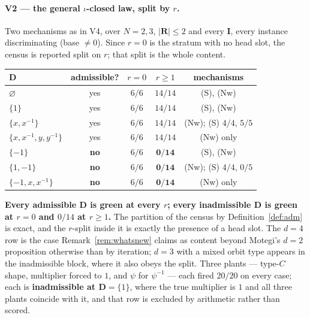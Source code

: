 \documentclass[11pt]{article}
\theoremstyle{definition}
\newcommand{\bI}{\mathbf{I}}
\newcommand{\bD}{\mathbf{D}}
\newcommand{\bR}{\mathbf{R}}
\begin{document}
\paragraph{V2 --- the general $\iota$-closed law, split by $r$.}  Two mechanisms
as in V4, over $N=2,3$, $|\bR|\le2$ and every $\bI$, every instance
discriminating (base $\ne0$).  Since $r=0$ is the stratum with no head slot, the
census is reported split on $r$; that split is the whole content.
\begin{center}
\begin{tabular}{@{}lcccc@{}}
\toprule
$\bD$ & admissible? & $r=0$ & $r\ge1$ & mechanisms\\
\midrule
$\varnothing$                & yes & $6/6$ & $14/14$ & (S), (Nw)\\
$\{1\}$                      & yes & $6/6$ & $14/14$ & (S), (Nw)\\
$\{x,x^{-1}\}$               & yes & $6/6$ & $14/14$ & (Nw); (S) $4/4$, $5/5$\\
$\{x,x^{-1},y,y^{-1}\}$      & yes & $6/6$ & $14/14$ & (Nw) only\\
\midrule
$\{-1\}$                     & \textbf{no} & $6/6$ & $\mathbf{0/14}$ & (S), (Nw)\\
$\{1,-1\}$                   & \textbf{no} & $6/6$ & $\mathbf{0/14}$ & (Nw); (S) $4/4$, $0/5$\\
$\{-1,x,x^{-1}\}$            & \textbf{no} & $6/6$ & $\mathbf{0/14}$ & (Nw) only\\
\bottomrule
\end{tabular}
\end{center}
\textbf{Every admissible $\bD$ is green at every $r$; every inadmissible $\bD$ is
green at $r=0$ and $0/14$ at $r\ge1$.}  The partition of the census by
Definition~\ref{def:adm} is exact, and the $r$-split inside it is exactly the
presence of a head slot.  The $d=4$ row is the case
Remark~\ref{rem:whatsnew} claims as content beyond Motegi's $d=2$ proposition
otherwise than by iteration; $d=3$ with a mixed orbit type appears in the
inadmissible block, where it also obeys the split.  Three plants --- type-$C$
shape, multiplier forced to $1$, and $\psi$ for $\psi^{-1}$ --- each fired
$20/20$ on every case; each is \textbf{inadmissible at $\bD=\{1\}$}, where the
true multiplier is $1$ and all three plants coincide with it, and that row is
excluded by arithmetic rather than scored.
\end{document}
